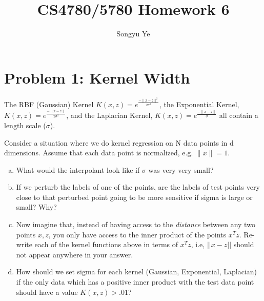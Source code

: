 \documentclass[11pt]{article}
\title{CS4780/5780 Homework 6}
\author{Songyu Ye}
\begin{document}
    \maketitle
\section*{Problem 1: Kernel Width}

The RBF (Gaussian) Kernel $K(x,z)=e^{\frac{-\|x-z\|^2}{2\sigma^2}}$, 
the Exponential Kernel, $K(x,z)=e^{\frac{-\|x-z\|}{2\sigma^2}}$, 
and the Laplacian Kernel,
$K(x,z)=e^{\frac{-\|x-z\|}{\sigma}}$
all contain a length scale ($\sigma$).  


Consider a situation where we do kernel regression on N data points in d dimensions.  
Assume that each data point is normalized, e.g. $\|x\|=1$.  


\begin{enumerate}[a.]
    \item What would the interpolant look like if $\sigma$ was very very small? 
    \item If we perturb the labels of one of the points, are the labels of test points very close to that perturbed point going to be more sensitive if sigma is large or small?  Why?
    \item Now imagine that, instead of having access to the \textit{distance} between any two points $x, z$, you only have access to the inner product of the points $x^Tz$.  Re-write each of the kernel functions above in terms of $x^Tz$, i.e, $||x - z||$ should not appear anywhere in your answer.
    \item How should we set sigma for each kernel (Gaussian, Exponential, Laplacian) if the only data which has a positive inner product with the test data point should have a value $K(x,z)>.01$?
\end{enumerate}
\end{document}
